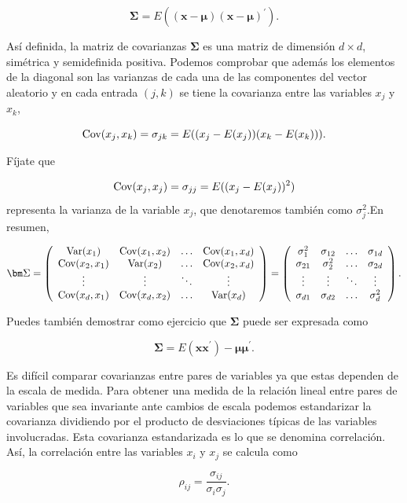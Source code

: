 \documentclass[
  a4paper,
  oneside]{scrbook}
\theoremstyle{definition}
\theoremstyle{definition}
\theoremstyle{definition}
\theoremstyle{definition}
\theoremstyle{remark}
\begin{document}
\[\label{Sigma}
\bm\Sigma=E((\bm{x}-\bm\mu)(\bm{x}-\bm\mu)^\prime{}).\]

Así definida, la matriz de covarianzas \(\bm\Sigma\) es una matriz de
dimensión \(d\times d\), simétrica y semidefinida positiva. Podemos
comprobar que además los elementos de la diagonal son las varianzas de
cada una de las componentes del vector aleatorio y en cada entrada
\((j,k)\) se tiene la covarianza entre las variables \(x_j\) y \(x_k\),

\[\textnormal{Cov}(x_j,x_k)=\sigma_{jk}=E((x_j-E(x_j))(x_k-E(x_k))).\]

Fíjate que

\[\textnormal{Cov}(x_j,x_j)=\sigma_{jj}=E((x_j-E(x_j))^2)\]
representa la varianza de la variable \(x_j\), que denotaremos también
como \(\sigma_j^2\).En resumen,

\[\bm\Sigma=\left(\begin{array}{cccc}\textnormal{Var}(x_1)&\textnormal{Cov}(x_1,x_2)&\ldots&\textnormal{Cov}(x_1,x_d)\\
\textnormal{Cov}(x_2,x_1)&\textnormal{Var}(x_2)&\ldots&\textnormal{Cov}(x_2,x_d)\\
\vdots&\vdots&\ddots&\vdots\\
\textnormal{Cov}(x_d,x_1)&\textnormal{Cov}(x_d,x_2)&\ldots&\textnormal{Var}(x_d)\end{array}\right)=\left(\begin{array}{cccc}\sigma_1^2&\sigma_{12}&\ldots&\sigma_{1d}\\
\sigma_{21}&\sigma_{2}^2&\ldots&\sigma_{2d}\\
\vdots&\vdots&\ddots&\vdots\\
\sigma_{d1}&\sigma_{d2}&\ldots&\sigma_{d}^2\end{array}\right).\]

Puedes también demostrar como ejercicio que \(\bm\Sigma\) puede ser
expresada como

\[\bm\Sigma=E(\bm{x}\bm{x}^\prime)-\bm\mu\bm\mu^\prime.\]

Es difícil comparar covarianzas entre pares de variables ya que estas
dependen de la escala de medida. Para obtener una medida de la relación
lineal entre pares de variables que sea invariante ante cambios de
escala podemos estandarizar la covarianza dividiendo por el producto de
desviaciones típicas de las variables involucradas. Esta covarianza
estandarizada es lo que se denomina correlación. Así, la correlación
entre las variables \(x_i\) y \(x_j\) se calcula como

\[\rho_{ij}=\frac{\sigma_{ij}}{\sigma_i\sigma_j}.\]
\end{document}
